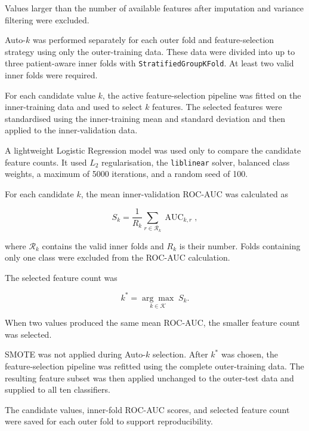 \documentclass[12pt,twocolumn]{article}
\begin{document}
Values larger than the number of available features after imputation
and variance filtering were excluded.

Auto-\(k\) was performed separately for each outer fold and
feature-selection strategy using only the outer-training data. These
data were divided into up to three patient-aware inner folds with
\texttt{StratifiedGroupKFold}. At least two valid inner folds were
required.

For each candidate value \(k\), the active feature-selection pipeline
was fitted on the inner-training data and used to select \(k\)
features. The selected features were standardised using the
inner-training mean and standard deviation and then applied to the
inner-validation data.

A lightweight Logistic Regression model was used only to compare the
candidate feature counts. It used \(L_2\) regularisation, the
\texttt{liblinear} solver, balanced class weights, a maximum of 5000
iterations, and a random seed of 100.

For each candidate \(k\), the mean inner-validation ROC-AUC was
calculated as

\begin{equation}
S_k=
\frac{1}{R_k}
\sum_{r\in\mathcal{R}_k}
\operatorname{AUC}_{k,r},
\label{eq:auto_k_mean_score}
\end{equation}

where \(\mathcal{R}_k\) contains the valid inner folds and \(R_k\) is
their number. Folds containing only one class were excluded from the
ROC-AUC calculation.

The selected feature count was

\begin{equation}
k^{*}
=
\underset{k\in\mathcal{K}}{\arg\max}\;S_k.
\label{eq:auto_k_selection}
\end{equation}

When two values produced the same mean ROC-AUC, the smaller feature
count was selected.

SMOTE was not applied during Auto-\(k\) selection. After \(k^{*}\) was
chosen, the feature-selection pipeline was refitted using the complete
outer-training data. The resulting feature subset was then applied
unchanged to the outer-test data and supplied to all ten classifiers.

The candidate values, inner-fold ROC-AUC scores, and selected feature
count were saved for each outer fold to support reproducibility.
\end{document}
